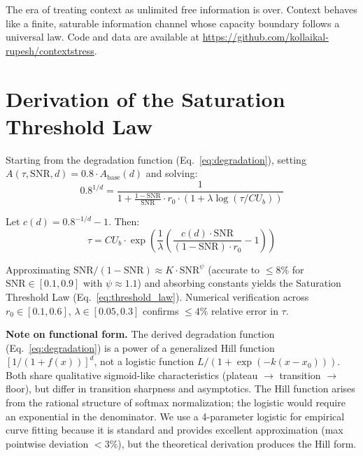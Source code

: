 \documentclass{article}
\begin{document}
The era of treating context as unlimited free information is over. Context behaves like a finite, saturable information channel whose capacity boundary follows a universal law. Code and data are available at \url{https://github.com/kollaikal-rupesh/contextstress}.




\appendix

\section{Derivation of the Saturation Threshold Law}
\label{app:derivation}

Starting from the degradation function (Eq.~\ref{eq:degradation}), setting $A(\tau, \mathrm{SNR}, d) = 0.8 \cdot A_{\text{base}}(d)$ and solving:
\begin{equation}
0.8^{1/d} = \frac{1}{1 + \frac{1-\mathrm{SNR}}{\mathrm{SNR}} \cdot r_0 \cdot (1 + \lambda \log(\tau/CU_b))}
\end{equation}

Let $c(d) = 0.8^{-1/d} - 1$. Then:
\begin{equation}
\tau = CU_b \cdot \exp\!\left(\frac{1}{\lambda}\left(\frac{c(d) \cdot \mathrm{SNR}}{(1-\mathrm{SNR}) \cdot r_0} - 1\right)\right)
\end{equation}

Approximating $\mathrm{SNR}/(1{-}\mathrm{SNR}) \approx K \cdot \mathrm{SNR}^\psi$ (accurate to ${\leq}8\%$ for $\mathrm{SNR} \in [0.1, 0.9]$ with $\psi \approx 1.1$) and absorbing constants yields the Saturation Threshold Law (Eq.~\ref{eq:threshold_law}). Numerical verification across $r_0 \in [0.1, 0.6]$, $\lambda \in [0.05, 0.3]$ confirms $\leq 4\%$ relative error in $\tau$.

\textbf{Note on functional form.} The derived degradation function (Eq.~\ref{eq:degradation}) is a power of a generalized Hill function $[1/(1 + f(x))]^d$, not a logistic function $L/(1+\exp(-k(x-x_0)))$. Both share qualitative sigmoid-like characteristics (plateau $\to$ transition $\to$ floor), but differ in transition sharpness and asymptotics. The Hill function arises from the rational structure of softmax normalization; the logistic would require an exponential in the denominator. We use a 4-parameter logistic for empirical curve fitting because it is standard and provides excellent approximation (max pointwise deviation ${<}3\%$), but the theoretical derivation produces the Hill form.
\end{document}
